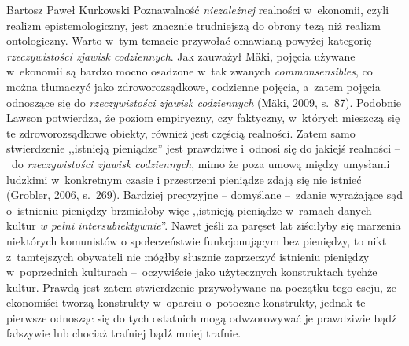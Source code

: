 \begin{artplenv}{Bartosz Paweł Kurkowski}
Poznawalność \textit{niezależnej} realności w~ekonomii, czyli realizm epistemologiczny, jest znacznie trudniejszą do
obrony tezą niż realizm ontologiczny. Warto w~tym temacie przywołać omawianą powyżej kategorię \textit{rzeczywistości
zjawisk codziennych}. Jak zauważył Mäki, pojęcia używane w~ekonomii są bardzo mocno osadzone w~tak zwanych
\textit{commonsensibles}, co można tłumaczyć jako zdroworozsądkowe, codzienne pojęcia, a~zatem pojęcia odnoszące się do
\textit{rzeczywistości zjawisk codziennych} \label{ref:RNDNG485CuHM7}(Mäki, 2009, s.~87). Podobnie Lawson potwierdza,
że poziom empiryczny, czy faktyczny, w~których mieszczą się te zdroworozsądkowe obiekty, również jest częścią
realności. Zatem samo stwierdzenie ,,istnieją pieniądze'' jest prawdziwe i~odnosi się do jakiejś realności --~do
\textit{rzeczywistości zjawisk codziennych}, mimo że poza umową między umysłami ludzkimi w~konkretnym czasie i
przestrzeni pieniądze zdają się nie istnieć \label{ref:RNDMaFsLdOLtr}(Grobler, 2006, s.~269). Bardziej precyzyjne –
domyślane --~zdanie wyrażające sąd o~istnieniu pieniędzy brzmiałoby więc ,,istnieją pieniądze w~ramach danych kultur
\textit{w pełni intersubiektywnie}''. Nawet jeśli za paręset lat ziściłyby się marzenia niektórych komunistów o
społeczeństwie funkcjonującym bez pieniędzy, to nikt z~tamtejszych obywateli nie mógłby słusznie zaprzeczyć istnieniu
pieniędzy w~poprzednich kulturach --~oczywiście jako użytecznych konstruktach tychże kultur. Prawdą jest zatem
stwierdzenie przywoływane na początku tego eseju, że ekonomiści tworzą konstrukty w~oparciu o~potoczne konstrukty,
jednak te pierwsze odnosząc się do tych ostatnich mogą odwzorowywać je prawdziwie bądź fałszywie lub chociaż trafniej
bądź mniej trafnie.



\end{artplenv}
